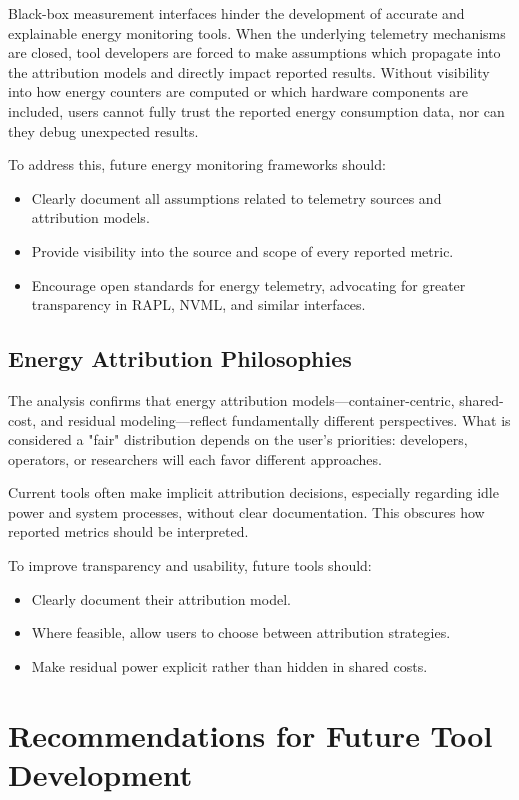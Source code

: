 Black-box measurement interfaces hinder the development of accurate and explainable energy monitoring tools. When the underlying telemetry mechanisms are closed, tool developers are forced to make assumptions which propagate into the attribution models and directly impact reported results. Without visibility into how energy counters are computed or which hardware components are included, users cannot fully trust the reported energy consumption data, nor can they debug unexpected results.

To address this, future energy monitoring frameworks should:
\begin{itemize}
    \item Clearly document all assumptions related to telemetry sources and attribution models.
    \item Provide visibility into the source and scope of every reported metric.
    \item Encourage open standards for energy telemetry, advocating for greater transparency in RAPL, NVML, and similar interfaces.
\end{itemize}

\subsection{Energy Attribution Philosophies}

The analysis confirms that energy attribution models—container-centric, shared-cost, and residual modeling—reflect fundamentally different perspectives. What is considered a "fair" distribution depends on the user’s priorities: developers, operators, or researchers will each favor different approaches.

Current tools often make implicit attribution decisions, especially regarding idle power and system processes, without clear documentation. This obscures how reported metrics should be interpreted.

To improve transparency and usability, future tools should:
\begin{itemize}
    \item Clearly document their attribution model.
    \item Where feasible, allow users to choose between attribution strategies.
    \item Make residual power explicit rather than hidden in shared costs.
\end{itemize}

\section{Recommendations for Future Tool Development}
\label{sec:future-tools}

